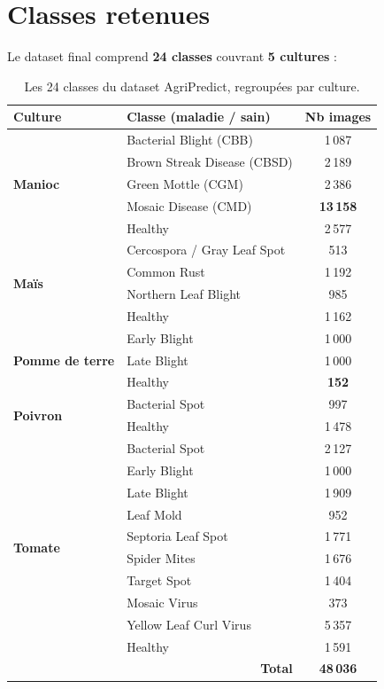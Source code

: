 \documentclass[12pt, a4paper, twoside]{report}
\begin{document}
\section{Classes retenues}

Le dataset final comprend \textbf{24 classes} couvrant \textbf{5 cultures} :

\begin{table}[H]
\centering
\caption{Les 24 classes du dataset AgriPredict, regroupées par culture.}
\label{tab:classes}
\small
\begin{tabular}{llc}
\toprule
\textbf{Culture} & \textbf{Classe (maladie / sain)} & \textbf{Nb images} \\
\midrule
\multirow{5}{*}{\textbf{Manioc}} 
  & Bacterial Blight (CBB)    & 1\,087 \\
  & Brown Streak Disease (CBSD) & 2\,189 \\
  & Green Mottle (CGM)        & 2\,386 \\
  & Mosaic Disease (CMD)      & \textbf{13\,158} \\
  & Healthy                   & 2\,577 \\
\midrule
\multirow{4}{*}{\textbf{Maïs}}
  & Cercospora / Gray Leaf Spot & 513 \\
  & Common Rust               & 1\,192 \\
  & Northern Leaf Blight       & 985 \\
  & Healthy                   & 1\,162 \\
\midrule
\multirow{3}{*}{\textbf{Pomme de terre}}
  & Early Blight              & 1\,000 \\
  & Late Blight               & 1\,000 \\
  & Healthy                   & \textbf{152} \\
\midrule
\multirow{2}{*}{\textbf{Poivron}}
  & Bacterial Spot            & 997 \\
  & Healthy                   & 1\,478 \\
\midrule
\multirow{10}{*}{\textbf{Tomate}}
  & Bacterial Spot            & 2\,127 \\
  & Early Blight              & 1\,000 \\
  & Late Blight               & 1\,909 \\
  & Leaf Mold                 & 952 \\
  & Septoria Leaf Spot        & 1\,771 \\
  & Spider Mites              & 1\,676 \\
  & Target Spot               & 1\,404 \\
  & Mosaic Virus              & 373 \\
  & Yellow Leaf Curl Virus    & 5\,357 \\
  & Healthy                   & 1\,591 \\
\midrule
\multicolumn{2}{r}{\textbf{Total}} & \textbf{48\,036} \\
\bottomrule
\end{tabular}
\end{table}
\end{document}
